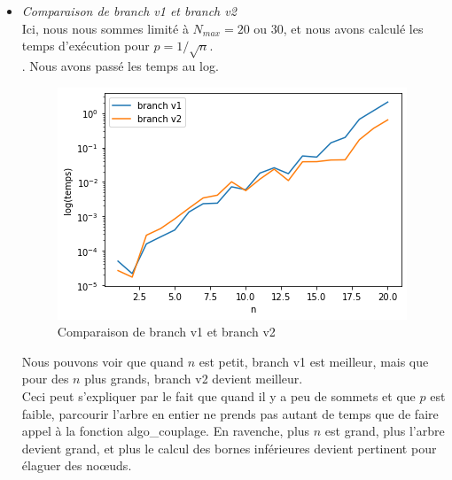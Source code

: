 \documentclass[12pt]{article}
\begin{document}
        \begin{itemize}
            \item \textit{Comparaison de branch v1 et branch v2} \\
                Ici, nous nous sommes limité à $N_{max} = 20$ ou 30, et nous avons calculé les temps d'exécution pour $p = 1/\sqrt{n}$. \\
            . Nous avons passé les temps au log.
    
                \begin{figure}[H]
                    \caption{Comparaison de branch v1 et branch v2}
                    \includegraphics[scale=0.6]{figures/branch1-2_psqrt.png}
                    \centering
                \end{figure}
    
                Nous pouvons voir que quand $n$ est petit, branch v1 est meilleur, mais que pour des $n$ plus grands, branch v2 devient meilleur. \\
                Ceci peut s'expliquer par le fait que quand il y a peu de sommets et que $p$ est faible, parcourir l'arbre en entier ne prends pas autant de temps que de faire appel à la fonction algo\_couplage. En ravenche, plus $n$ est grand, plus l'arbre devient grand, et plus le calcul des bornes inférieures devient pertinent pour élaguer des noœuds.


\end{itemize}
\end{document}

